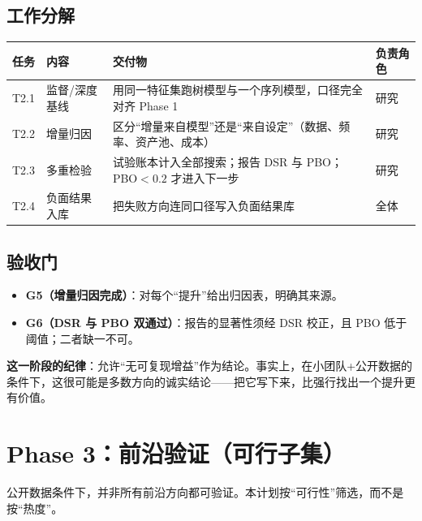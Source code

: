 \documentclass[11pt,a4paper]{ctexart}
\begin{document}
\subsection{工作分解}

\begin{longtable}{@{}>{\raggedright\arraybackslash}p{1.0cm}>{\raggedright\arraybackslash}p{4.4cm}>{\raggedright\arraybackslash}p{5.6cm}>{\raggedright\arraybackslash}p{2.6cm}@{}}
\toprule
任务 & 内容 & 交付物 & 负责角色 \\
\midrule
\endhead
T2.1 & 监督/深度基线 & 用同一特征集跑树模型与一个序列模型，口径完全对齐 Phase 1 & 研究 \\
T2.2 & 增量归因 & 区分“增量来自模型”还是“来自设定”（数据、频率、资产池、成本） & 研究 \\
T2.3 & 多重检验 & 试验账本计入全部搜索；报告 DSR 与 PBO；PBO$<0.2$ 才进入下一步 & 研究 \\
T2.4 & 负面结果入库 & 把失败方向连同口径写入负面结果库 & 全体 \\
\bottomrule
\end{longtable}

\subsection{验收门}

\begin{itemize}
  \item \textbf{G5（增量归因完成）}：对每个“提升”给出归因表，明确其来源。
  \item \textbf{G6（DSR 与 PBO 双通过）}：报告的显著性须经 DSR 校正，且 PBO 低于阈值；二者缺一不可。
\end{itemize}

\noindent\textbf{这一阶段的纪律}：允许“无可复现增益”作为结论。事实上，在小团队+公开数据的条件下，这很可能是多数方向的诚实结论——把它写下来，比强行找出一个提升更有价值。

\section{Phase 3：前沿验证（可行子集）}

公开数据条件下，并非所有前沿方向都可验证。本计划按“可行性”筛选，而不是按“热度”。
\end{document}
